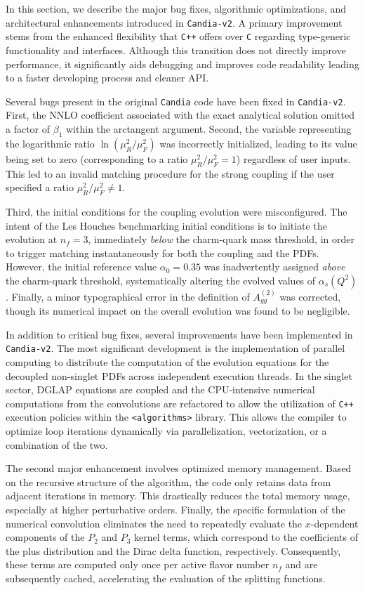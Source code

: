 \documentclass[preprint,12pt]{elsarticle}
\begin{document}
In this section, we describe the major bug fixes, algorithmic optimizations, and architectural enhancements introduced in \texttt{Candia-v2}. A primary improvement stems from the enhanced flexibility that \texttt{C++} offers over \texttt{C} regarding type-generic functionality and interfaces. Although this transition does not directly improve performance, it significantly aids debugging and improves code readability leading to a faster developing process and cleaner API.

Several bugs present in the original \texttt{Candia} code have been fixed in \texttt{Candia-v2}. First, the NNLO coefficient associated with the exact analytical solution omitted a factor of $\beta_1$ within the arctangent argument. Second, the variable representing the logarithmic ratio $\ln(\mu_R^2/\mu_F^2)$ was incorrectly initialized, leading to its value being set to zero (corresponding to a ratio $\mu_R^2/\mu_F^2 = 1$) regardless of user inputs. This led to an invalid matching procedure for the strong coupling if the user specified a ratio $\mu_R^2/\mu_F^2 \neq 1$.
 
Third, the initial conditions for the coupling evolution were misconfigured. The intent of the Les Houches benchmarking initial conditions is to initiate the evolution at $n_f=3$, immediately \textit{below} the charm-quark mass threshold, in order to trigger matching instantaneously for both the coupling and the PDFs. However, the initial reference value $\alpha_0=0.35$ was inadvertently assigned \textit{above} the charm-quark  threshold, systematically altering the evolved values of $\alpha_s(Q^2)$. Finally, a minor typographical error in the definition of $A_{gg}^{(2)}$ was corrected, though its numerical impact on the overall evolution was found to be negligible.

In addition to critical bug fixes, several improvements have been implemented in \texttt{Candia-v2}. The most significant development is  the implementation of parallel computing to distribute the computation of the evolution equations for the decoupled non-singlet PDFs across independent execution threads. In the singlet sector, DGLAP equations are coupled and the CPU-intensive numerical computations from the convolutions are refactored to allow the utilization of \texttt{C++} execution policies within the \texttt{<algorithms>} library. This allows the compiler to optimize loop iterations dynamically via parallelization, vectorization, or a combination of the two.

The second major enhancement involves optimized memory management. Based on the recursive structure of the algorithm, the code only retains data from adjacent iterations in memory. This drastically reduces the total memory usage, especially at higher perturbative orders. Finally, the specific formulation of the numerical convolution eliminates the need to repeatedly evaluate the $x$-dependent components of the $P_2$ and $P_3$ kernel terms, which correspond to the coefficients of the plus distribution and the Dirac delta function, respectively. Consequently, these terms are computed only once per active flavor number $n_f$ and are subsequently cached, accelerating the evaluation of the splitting functions.
\end{document}
